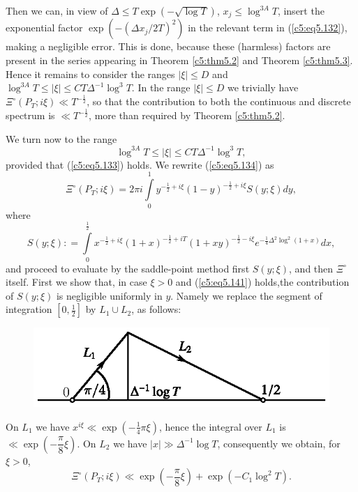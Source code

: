 Then  we can, in view of $\Delta \leq T \exp (-\sqrt{\log T})$, $x_j
\leq \log^{3A} T$, insert the exponential factor $\exp (-(\Delta x_j/
2T)^2)$ in the relevant term in (\ref{c5:eq5.132}), making a
negligible error. This is done, because these (harmless) factors are
present in the series appearing in Theorem \ref{c5:thm5.2} and Theorem
\ref{c5:thm5.3}. Hence it remains to consider the ranges $|\xi| \leq
D$ and $\log^{3A} T \leq |\xi| \leq CT\Delta^{-1} \log^3T$. In the
range $|\xi| \leq D$ we trivially have $\Xi^\circ (P_T; i\xi) \ll
T^{-\frac{1}{2}}$, so that the contribution to both the continuous and
discrete spectrum is $\ll T^{-\frac{1}{2}}$, more than required by
Theorem \ref{c5:thm5.2}.  

We turn now to the range
\begin{equation}
\log^{3A} T \leq |\xi| \leq CT\Delta^{-1} \log^3
T,\label{c5:eq5.141} 
\end{equation}
provided that (\ref{c5:eq5.133}) holds. We rewrite (\ref{c5:eq5.134})
as  
\begin{equation}
\Xi^\circ (P_T; i\xi) = 2 \pi i \int\limits^1_0 y^{-\frac{1}{2} + i
  \xi} (1-y)^{-\frac{1}{2} + i \xi} S(y;\xi) dy,
\label{c5:eq5.142} 
\end{equation}
where
\begin{equation}
S (y;\xi) : =\int\limits^{\frac{1}{2}}_0 x^{-\frac{1}{2} + i \xi}
(1+x)^{-\frac{1}{2}+ iT} (1+xy)^{-\frac{1}{2} - i \xi} e^{-\frac{1}{4}
  \Delta^2 \log^2 (1+x)} dx, 
\label{c5:eq5.143}
\end{equation}
and proceed to evaluate by the saddle-point method first $S(y;\xi)$,
and then $\Xi^\circ$ itself. First we show that, in case $\xi > 0$ and
(\ref{c5:eq5.141}) holds,\pageoriginale the contribution of $S(y;\xi)$
is negligible uniformly in $y$. Namely we replace the segment of
integration $[0,\frac{1}{2}]$ by $L_1 \cup L_2$, as follows: 

\begin{figure}[H]
\centering
\includegraphics{figures/5.3.eps}
\end{figure}

On $L_1$ we have $x^{i \xi} \ll \exp \left(-\frac{1}{4} \pi \xi
\right)$, hence the integral over $L_1$ is $\ll \exp
\left(-\dfrac{\pi}{8} \xi \right)$. On $L_2$ we have $|x| \gg
\Delta^{-1} \log T$, consequently we obtain, for $\xi > 0$, 
\begin{equation}
\Xi^\circ (P_T;i\xi) \ll \exp \left(-\frac{\pi}{8} \xi \right) + \exp
(-C_1 \log^2 T).\label{c5:eq5.144} 
\end{equation}

